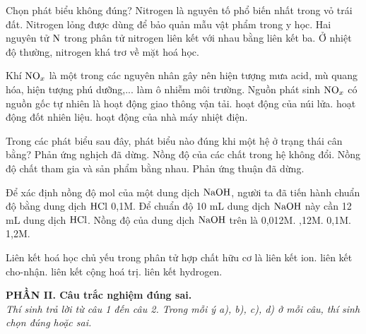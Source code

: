 \documentclass[11pt,a4paper]{article}
\begin{document}
\begin{ex}
Chọn phát biểu không đúng?
\choice
{\True Nitrogen là nguyên tố phổ biến nhất trong vỏ trái đất.}
{Nitrogen lỏng được dùng để bảo quản mẫu vật phẩm trong y học.}
{Hai nguyên tử $\ce{N}$ trong phân tử nitrogen liên kết với nhau bằng liên kết ba.}
{Ở nhiệt độ thường, nitrogen khá trơ về mặt hoá học.}
\end{ex}
\begin{ex}
Khí $\ce{NO_x}$ là một trong các nguyên nhân gây nên hiện tượng mưa acid, mù quang hóa, hiện tượng phú dưỡng,... làm ô nhiễm môi trường. Nguồn phát sinh $\ce{NO_x}$ có nguồn gốc tự nhiên là
\choice
{hoạt động giao thông vận tải.}
{\True hoạt động của núi lửa.}
{hoạt động đốt nhiên liệu.}
{hoạt động của nhà máy nhiệt điện.}
\end{ex}
\begin{ex}
Trong các phát biểu sau đây, phát biểu nào đúng khi một hệ ở trạng thái cân bằng?
\choice
{Phản ứng nghịch đã dừng.}
{\True Nồng độ của các chất trong hệ không đổi.}
{Nồng độ chất tham gia và sản phẩm bằng nhau.}
{Phản ứng thuận đã dừng.}
\end{ex}
\begin{ex}
Để xác định nồng độ mol của một dung dịch $\ce{NaOH}$, người ta đã tiến hành chuẩn độ bằng dung dịch $\ce{HCl}$ 0,1M. Để chuẩn độ 10 mL dung dịch $\ce{NaOH}$ này cần 12 mL dung dịch $\ce{HCl}$. Nồng độ của dung dịch $\ce{NaOH}$ trên là
\choice
{0,012M.}
{,12M.}
{0,1M.}
{1,2M.}
\end{ex}
\begin{ex}
Liên kết hoá học chủ yếu trong phân tử hợp chất hữu cơ là
\choice
{liên kết ion.}
{liên kết cho-nhận.}
{\True liên kết cộng hoá trị.}
{liên kết hydrogen.}
\end{ex}
\vspace{4pt}
\noindent
{\color{mainGreen}\textbf{\large PHẦN II. Câu trắc nghiệm đúng sai.}}\\
\textit{\small Thí sinh trả lời từ câu 1 đến câu 2. Trong mỗi ý a), b), c), d) ở mỗi câu, thí sinh chọn đúng hoặc sai.}
\vspace{2pt}
\end{document}
